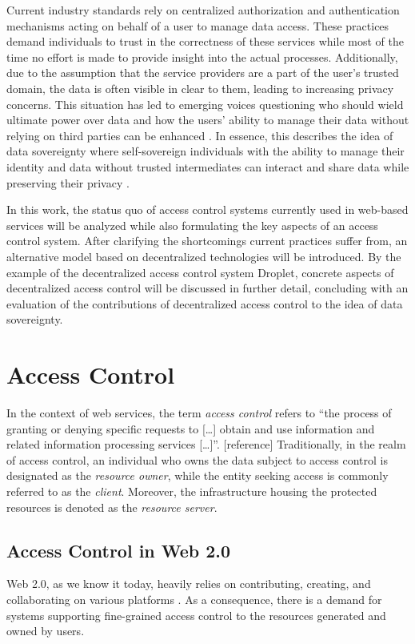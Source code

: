 \documentclass[conference]{IEEEtran}
\begin{document}
Current industry standards rely on centralized authorization and authentication mechanisms acting on behalf of a user to manage data access. \cite{hardt_oauth_2012,noauthor_googles_nodate}
These practices demand individuals to trust in the correctness of these services while most of the time no effort is made to provide insight into the actual processes.
Additionally, due to the assumption that the service providers are a part of the user's trusted domain, the data is often visible in clear to them, leading to increasing privacy concerns.
This situation has led to emerging voices questioning who should wield ultimate power over data and how the users' ability to manage their data without relying on third parties can be enhanced \cite{noauthor_w3f_nodate}.
In essence, this describes the idea of data sovereignty where self-sovereign individuals with the ability to manage their identity and data without trusted intermediates can interact and share data while preserving their privacy \cite{ernstberger_sok_2023}.

In this work, the status quo of access control systems currently used in web-based services will be analyzed while also formulating the key aspects of an access control system.
After clarifying the shortcomings current practices suffer from, an alternative model based on decentralized technologies will be introduced.
By the example of the decentralized access control system Droplet, concrete aspects of decentralized access control will be discussed in further detail, concluding with an evaluation of the contributions of decentralized access control to the idea of data sovereignty.

\section{Access Control}
In the context of web services, the term \textit{access control} refers to \enquote{the process of granting or denying specific requests to [\dots] obtain and use information and related information processing services [\dots]}. [reference] %
Traditionally, in the realm of access control, an individual who owns the data subject to access control is designated as the \textit{resource owner}, while the entity seeking access is commonly referred to as the \textit{client}.
Moreover, the infrastructure housing the protected resources is denoted as the \textit{resource server}.

\subsection{Access Control in Web 2.0}
Web 2.0, as we know it today, heavily relies on contributing, creating, and collaborating on various platforms \cite{community_web_2019}.
As a consequence, there is a demand for systems supporting fine-grained access control to the resources generated and owned by users.
\end{document}
